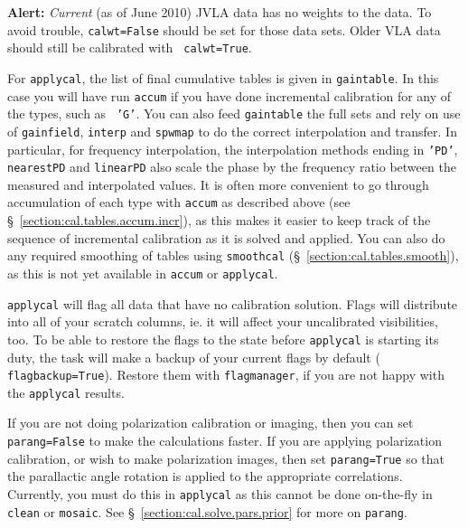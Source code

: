 {\bf Alert:} {\it Current} (as of June 2010) JVLA data has no weights
to the data. To avoid trouble, {\tt calwt=False} should be set for
those data sets. Older VLA data should still be calibrated with {\tt
  calwt=True}.

For {\tt applycal}, the list of final cumulative tables is given in
{\tt gaintable}.  In this case you will have run {\tt accum} if you
have done incremental calibration for any of the types, such as {\tt
  'G'}.  You can also feed {\tt gaintable} the full sets and rely on
use of {\tt gainfield}, {\tt interp} and {\tt spwmap} to do the
correct interpolation and transfer.  In particular, for frequency
interpolation, the interpolation methods ending in {\tt 'PD'}, {\tt
  nearestPD} and {\tt linearPD} also scale the phase by the frequency
ratio between the measured and interpolated values. It is often more
convenient to go through accumulation of each type with {\tt accum} as
described above (see \S~\ref{section:cal.tables.accum.incr}), as this
makes it easier to keep track of the sequence of incremental
calibration as it is solved and applied.  You can also do any required
smoothing of tables using {\tt smoothcal}
(\S~\ref{section:cal.tables.smooth}), as this is not yet available in
{\tt accum} or {\tt applycal}.


{\tt applycal} will flag all data that have no calibration
solution. Flags will distribute into all of your scratch columns,
ie. it will affect your uncalibrated visibilities, too. To be able to
restore the flags to the state before {\tt applycal} is starting its
duty, the task will make a backup of your current flags by default ({\tt
  flagbackup=True}). Restore them with {\tt flagmanager}, if you are
not happy with the {\tt applycal} results.



If you are not doing polarization calibration or imaging, then you can set 
{\tt parang=False} to make the calculations faster.  If you are
applying polarization calibration, or wish to make polarization
images, then set {\tt parang=True} so that the parallactic angle
rotation is applied to the appropriate correlations.  Currently,
you must do this in {\tt applycal} as this cannot be done on-the-fly
in {\tt clean} or {\tt mosaic}.  
See \S~\ref{section:cal.solve.pars.prior} for more on {\tt parang}.


